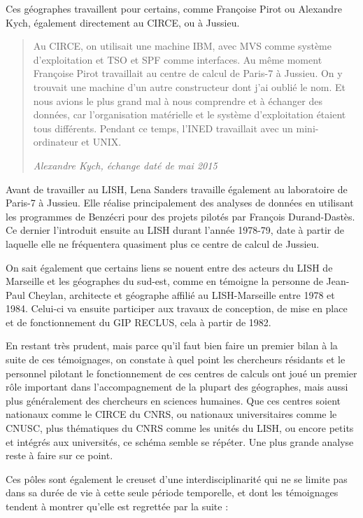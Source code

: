 Ces géographes travaillent pour certains, comme Françoise Pirot ou Alexandre Kych, également directement au CIRCE, ou à Jussieu.

\blockquote[\textit{Alexandre Kych, échange daté de mai 2015}]{Au CIRCE, on utilisait une machine IBM, avec MVS comme système d'exploitation et TSO et SPF comme interfaces. Au même moment Françoise Pirot travaillait au centre de calcul de Paris-7 à Jussieu. On y trouvait une machine d'un autre constructeur dont j'ai oublié le nom. Et nous avions le plus grand mal à nous comprendre et à échanger des données, car l'organisation matérielle et le système d'exploitation étaient tous différents. Pendant ce temps, l'INED travaillait avec un mini-ordinateur et UNIX.}

Avant de travailler au LISH, Lena Sanders travaille également au laboratoire de Paris-7 à Jussieu. Elle réalise principalement des analyses de données en utilisant les programmes de Benzécri pour des projets pilotés par François Durand-Dastès. Ce dernier l'introduit ensuite au LISH durant l'année 1978-79, date à partir de laquelle elle ne fréquentera quasiment plus ce centre de calcul de Jussieu.

On sait également que certains liens se nouent entre des acteurs du LISH de Marseille et les géographes du sud-est, comme en témoigne la personne de Jean-Paul Cheylan, architecte et géographe affilié au LISH-Marseille entre 1978 et 1984. Celui-ci va ensuite participer aux travaux de conception, de mise en place et de fonctionnement du GIP RECLUS, cela à partir de 1982.

En restant très prudent, mais parce qu'il faut bien faire un premier bilan à la suite de ces témoignages, on constate à quel point les chercheurs résidants et le personnel pilotant le fonctionnement de ces centres de calculs ont joué un premier rôle important dans l’accompagnement de la plupart des géographes, mais aussi plus généralement des chercheurs en sciences humaines. Que ces centres soient nationaux comme le CIRCE du CNRS, ou nationaux universitaires comme le CNUSC, plus thématiques du CNRS comme les unités du LISH, ou encore petits et intégrés aux universités, ce schéma semble se répéter. Une plus grande analyse reste à faire sur ce point.

Ces pôles sont également le creuset d'une interdisciplinarité qui ne se limite pas dans sa durée de vie à cette seule période temporelle, et dont les témoignages tendent à montrer qu'elle est regrettée par la suite :

